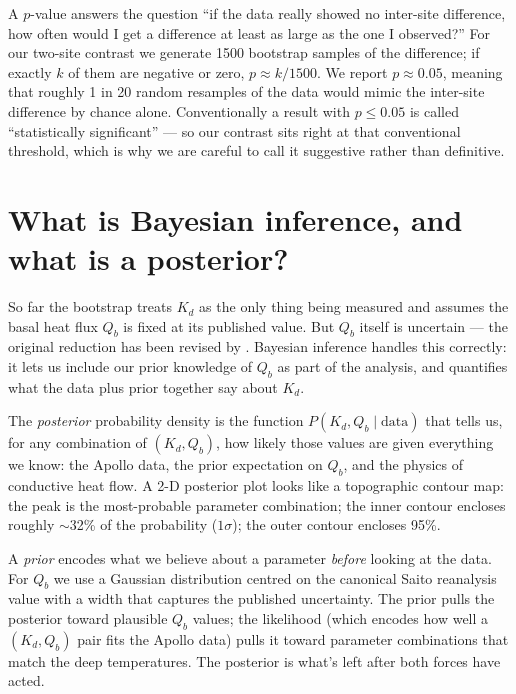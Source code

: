 \documentclass[11pt]{report}
\begin{document}
\begin{aside}
A $p$-value answers the question ``if the data really showed no
inter-site difference, how often would I get a difference at least
as large as the one I observed?'' For our two-site contrast we
generate 1500 bootstrap samples of the difference; if exactly $k$
of them are negative or zero, $p \approx k/1500$. We report
$p \approx 0.05$, meaning that roughly 1 in 20 random resamples
of the data would mimic the inter-site difference by chance alone.
Conventionally a result with $p \le 0.05$ is called ``statistically
significant'' --- so our contrast sits right at that conventional
threshold, which is why we are careful to call it suggestive rather
than definitive.
\end{aside}

\section{What is Bayesian inference, and what is a posterior?}

So far the bootstrap treats $K_d$ as the only thing being measured
and assumes the basal heat flux $Q_b$ is fixed at its published
value. But $Q_b$ itself is uncertain --- the original
\citet{langseth1976} reduction has been revised by
\citet{saito2007,nagihara2018}. Bayesian inference handles this
correctly: it lets us include our prior knowledge of $Q_b$ as part
of the analysis, and quantifies what the data plus prior together
say about $K_d$.

\begin{aside}
The \emph{posterior} probability density is the function
$P(K_d, Q_b \mid \mathrm{data})$ that tells us, for any
combination of $(K_d, Q_b)$, how likely those values are given
everything we know: the Apollo data, the prior expectation on
$Q_b$, and the physics of conductive heat flow. A 2-D posterior
plot looks like a topographic contour map: the peak is the
most-probable parameter combination; the inner contour encloses
roughly $\sim$32\% of the probability ($1\sigma$); the outer
contour encloses 95\%.
\end{aside}

\begin{aside}
A \emph{prior} encodes what we believe about a parameter
\emph{before} looking at the data. For $Q_b$ we use a Gaussian
distribution centred on the canonical Saito reanalysis value with
a width that captures the published uncertainty. The prior pulls
the posterior toward plausible $Q_b$ values; the likelihood (which
encodes how well a $(K_d, Q_b)$ pair fits the Apollo data) pulls
it toward parameter combinations that match the deep temperatures.
The posterior is what's left after both forces have acted.
\end{aside}
\end{document}
